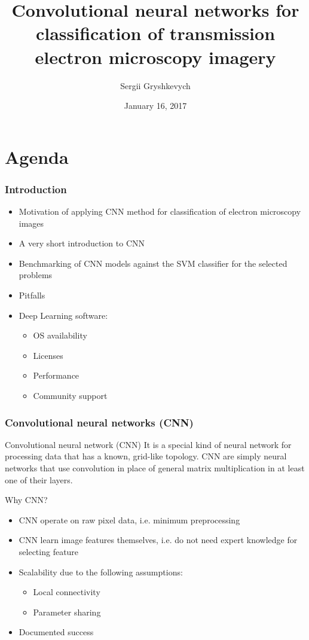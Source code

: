 \documentclass{beamer}
\title{Convolutional neural networks
for classification of transmission
electron microscopy imagery}
\subtitle{}
\author{Sergii Gryshkevych}
\institute{
Uppsala University \\
Supervisor: Max Pihlstr{\"o}m \\
Reviewer: Ida-Maria Sintorn 
}
\date{January 16, 2017}
\begin{document}
\begin{frame}
\titlepage
\end{frame}


\section{Agenda}


\begin{frame}
\frametitle{Introduction}
\begin{itemize}
\item<1-> Motivation of applying CNN method for classification of electron microscopy images
\item<2-> A very short introduction to CNN
\item<3-> Benchmarking of CNN models against the SVM classifier for the selected problems 
\item<4-> Pitfalls
\item<5-> Deep Learning software:
\begin{itemize}
\item OS availability
\item Licenses
\item Performance
\item Community support
\end{itemize} 
\end{itemize}
\end{frame}

%
%

\begin{frame}
\frametitle{Convolutional neural networks (CNN)}
\begin{block}{Convolutional neural network (CNN)}
It is a special kind of neural network for processing data that has a known, grid-like topology. CNN are simply neural networks that use convolution in place of general matrix multiplication in at least one of their layers.
\end{block}

Why CNN?
\begin{itemize}
\item CNN operate on raw pixel data, i.e. minimum preprocessing
\item CNN learn image features themselves, i.e. do not need expert knowledge for selecting feature
\item Scalability due to the following assumptions:
\begin{itemize}
\item Local connectivity
\item Parameter sharing
\end{itemize}
\item Documented success
\end{itemize}
\end{frame}
\end{document}
